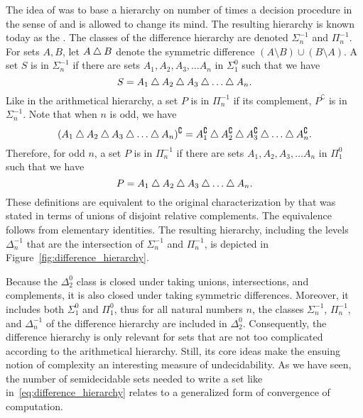 The idea of \citeauthor{ershov1968hierarchyi} was to base a hierarchy on number of times a decision procedure in the sense of \citeauthor{putnam1965trial} and \citeauthor{gold1965limiting} is allowed to change its mind.
The resulting hierarchy is known today as the  \parencite{downey2010algorithmic}.
The classes of the difference hierarchy are denoted $\Sigma^{-1}_n$ and $\Pi^{-1}_n$.
For sets $A, B$, let $A \bigtriangleup B$ denote the symmetric difference $(A \setminus B) \cup (B \setminus A)$.
A set $S$ is in $\Sigma^{-1}_n$ if there are sets $A_1, A_2, A_3, \ldots A_n$ in $\Sigma^0_1$ such that we have
\begin{equation}
\label{eq:difference_hierarchy}
  S = A_1 \bigtriangleup A_2 \bigtriangleup A_3 \bigtriangleup \ldots \bigtriangleup A_n.
\end{equation}
Like in the arithmetical hierarchy, a set $P$ is in $\Pi^{-1}_n$ if its complement, $P^\complement$ is in $\Sigma^{-1}_n$.
Note that when $n$ is odd, we have
\begin{equation*}
  (A_1 \bigtriangleup A_2 \bigtriangleup A_3 \bigtriangleup \ldots \bigtriangleup A_n)^\complement = A_1^\complement \bigtriangleup A_2^\complement \bigtriangleup A_3^\complement \bigtriangleup \ldots \bigtriangleup A_n^\complement.
\end{equation*}
Therefore, for odd $n$, a set $P$ is in $\Pi^{-1}_n$ if there are sets $A_1, A_2, A_3, \ldots A_n$ in $\Pi^0_1$ such that we have
\begin{equation*}
  P = A_1 \bigtriangleup A_2 \bigtriangleup A_3 \bigtriangleup \ldots \bigtriangleup A_n.
\end{equation*}
These definitions are equivalent to the original characterization by \textcite{ershov1968hierarchyi} that was stated in terms of unions of disjoint relative complements.
The equivalence follows from elementary identities.
The resulting hierarchy, including the levels $\Delta^{-1}_n$ that are the intersection of $\Sigma^{-1}_n$ and $\Pi^{-1}_n$, is depicted in Figure~\ref{fig:difference_hierarchy}.

Because the $\Delta^0_2$ class is closed under taking unions, intersections, and complements, it is also closed under taking symmetric differences.
Moreover, it includes both $\Sigma^0_1$ and $\Pi^0_1$, thus for all natural numbers $n$, the classes $\Sigma^{-1}_n$, $\Pi^{-1}_n$, and $\Delta^{-1}_n$ of the difference hierarchy are included in $\Delta^0_2$.
Consequently, the difference hierarchy is only relevant for sets that are not too complicated according to the arithmetical hierarchy.
Still, its core ideas make the ensuing notion of complexity an interesting measure of undecidability.
As we have seen, the number of semidecidable sets needed to write a set like in~\eqref{eq:difference_hierarchy} relates to a generalized form of convergence of computation.

